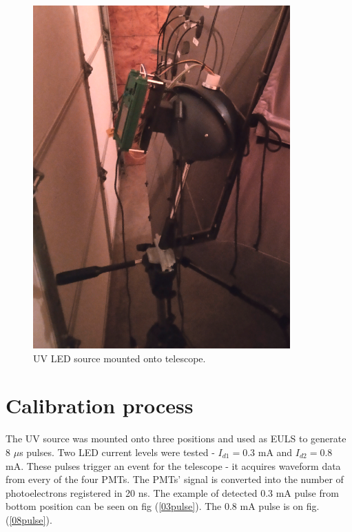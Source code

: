 \begin{figure}[H]
 \centering
 \includegraphics[scale=0.35, angle = 0]{./pictures/CalibMech.png}
 \caption{UV LED source mounted onto telescope.}
 \label{bottomCal}
 
\end{figure}
\section{Calibration process}
The UV source was mounted onto three positions and used as EULS to generate $8$ $\mu$s pulses. Two LED current levels were tested - $I_{d1} = 0.3$ mA and $I_{d2} = 0.8$ mA. These pulses trigger an event for the telescope - it acquires waveform data from every of the four PMTs. The PMTs' signal is converted into the number of photoelectrons registered in 20 ns. The example of detected 0.3 mA pulse from bottom position can be seen on fig (\ref{03pulse}). The 0.8 mA pulse is on fig. (\ref{08pulse}).


